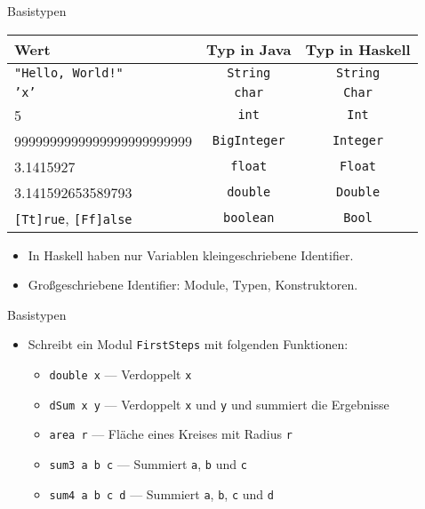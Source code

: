 \documentclass{beamer}
\begin{document}
\begin{frame}{Basistypen}
        \begin{tabular}{ l | c | c }
                Wert & Typ in Java & Typ in Haskell \\
                \hline
                \texttt{"Hello, World!"} & \texttt{String} & \pause \texttt{String} \\
                \texttt{'x'} & \texttt{char} & \pause \texttt{Char} \\
                5 & \texttt{int} & \pause \texttt{Int} \\
                9999999999999999999999999 & \texttt{BigInteger} & \pause \texttt{Integer} \\
                3.1415927 & \texttt{float} & \pause \texttt{Float} \\
                3.141592653589793 & \texttt{double} & \pause \texttt{Double} \\
                \texttt{[Tt]rue}, \texttt{[Ff]alse} & \texttt{boolean} & \pause \texttt{Bool} \\
        \end{tabular}

        \begin{itemize}
                \item In Haskell haben nur Variablen kleingeschriebene Identifier.
                \item Großgeschriebene Identifier: Module, Typen, Konstruktoren.
        \end{itemize}
\end{frame}

\begin{frame}{Basistypen}

        \begin{itemize}
                \item Schreibt ein Modul \texttt{FirstSteps} mit folgenden Funktionen:
                \begin{itemize}
                        \item \texttt{double x} --- Verdoppelt \texttt{x}
                        \item \texttt{dSum x y} --- Verdoppelt \texttt{x} und \texttt{y} und summiert die Ergebnisse
                        \item \texttt{area r} --- Fläche eines Kreises mit Radius \texttt{r}
                        \item \texttt{sum3 a b c} --- Summiert \texttt{a}, \texttt{b} und \texttt{c}
                        \item \texttt{sum4 a b c d} --- Summiert \texttt{a}, \texttt{b}, \texttt{c} und \texttt{d}
                \end{itemize}
        \end{itemize}
\end{frame}
\end{document}
